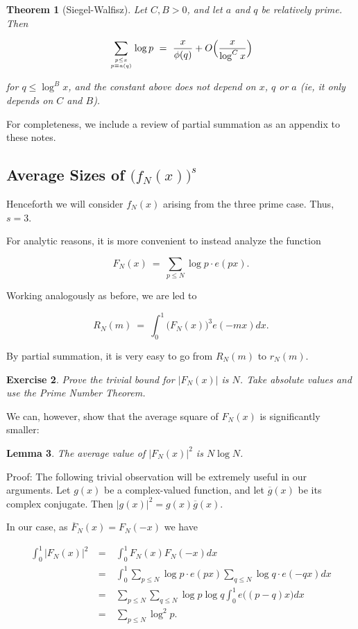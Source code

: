 \documentclass[12pt,letterpaper]{report}
\newcommand\be{\begin{equation}}
\newcommand\ee{\end{equation}}
\newcommand\bea{\begin{eqnarray}}
\newcommand\eea{\end{eqnarray}}
\newtheorem{thm}{Theorem}[section]
\newtheorem{lem}[thm]{Lemma}
\newtheorem{exe}[thm]{Exercise}
\begin{document}
\begin{thm}[Siegel-Walfisz] Let $C, B > 0$, and let $a$ and $q$ be relatively
prime. Then

\be \sum_{ {p \le x} \atop {p \equiv a (q)} } \log p \ = \
\frac{x}{\phi(q)} + O\Big( \frac{x}{\log^C x} \Big) \ee

for $q \le \log^B x$, and the constant above does not depend on
$x$, $q$ or $a$ (ie, it only depends on $C$ and $B$).
\end{thm}

For completeness, we include a review of partial summation as an
appendix to these notes.


\subsection{Average Sizes of $\Big(f_N(x)\Big)^s$}

Henceforth we will consider $f_N(x)$ arising from the three prime
case. Thus, $s = 3$.

For analytic reasons, it is more convenient to instead analyze the
function

\be F_N(x) \ = \ \sum_{p\le N} \log p \cdot e(px). \ee

Working analogously as before, we are led to

\be R_N(m) \ = \ \int_0^1 \Big( F_N(x) \Big)^3 e(-mx) dx. \ee

By partial summation, it is very easy to go from $R_N(m)$ to
$r_N(m)$.

\begin{exe} Prove the trivial bound for $|F_N(x)|$ is
$N$. Take absolute values and use the Prime Number Theorem.
\end{exe}

We can, however, show that the average square of $F_N(x)$ is
significantly smaller:

\begin{lem} The average value of $|F_N(x)|^2$ is
$N \log N$. \end{lem}

Proof: The following trivial observation will be extremely useful
in our arguments. Let $g(x)$ be a complex-valued function, and let
$\overline{g}(x)$ be its complex conjugate. Then $|g(x)|^2 =
g(x)\overline{g}(x)$.

In our case, as $\overline{F}_N(x) = F_N(-x)$ we have

\bea \int_0^1 | F_N(x) |^2  & \ = \ & \int_0^1 F_N(x) F_N(-x)dx
\nonumber\\ & \ = \ &  \int_0^1 \sum_{p \le N} \log p \cdot e(px)
\sum_{q \le N} \log q \cdot e(-qx) dx \nonumber\\ & \ = \ &
\sum_{p \le N} \sum_{q \le N} \log p \log q \int_0^1 e\Big((p -
q)x\Big)dx \nonumber\\ & \ = \ & \sum_{p \le N} \log^2 p. \eea
\end{document}
